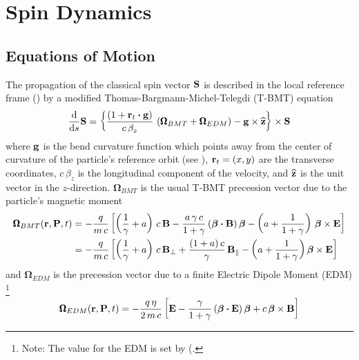 \chapter{Spin Dynamics}
\label{c:spin}

\section{Equations of Motion}
\label{s:spin.dyn}

The propagation of the classical spin vector ${\bf S}$ is described in the local reference
frame () by a modified Thomas-Bargmann-Michel-Telegdi
(T-BMT) equation\cite{b:spin.hoff}
\begin{equation}
  \frac{\mathrm{d}}{\mathrm{d}s} {\bf S} = 
  \left\{ \frac{(1+{\bf r}_t \mathbin{\boldsymbol{\cdot}} {\bf g})}{c \, \beta_z} \, 
  \left( {\pmb\Omega}_{BMT} + {\pmb\Omega}_{EDM} \right) - 
  {\bf g} \times {\widehat{\bf z}} \right\} \times \mathbf{S}
  \label{tbmt}
\end{equation}
where ${\bf g}$ is the bend curvature function which points away from the center of curvature
of the particle's reference orbit (see ), ${\bf r}_t = (x, y)$ are the
transverse coordinates, $c \, \beta_z$ is the longitudinal component of the velocity, and
${\widehat{\bf z}}$ is the unit vector in the $z$-direction. $\pmb\Omega_{BMT}$ is the usual T-BMT
precession vector due to the particle's magnetic moment
\begin{align}
  {\pmb\Omega}_{BMT} (\mathbf{r,P},t) &= 
    - \frac{q}{m \, c} \left[ 
    \left(\frac{1}{\gamma} + a \right) \, c \, {\bf B} -
    \frac{a \, \gamma \, c}{1 + \gamma} \, ( \boldsymbol{\beta} \mathbin{\boldsymbol{\cdot}} {\bf B} ) \, \boldsymbol{\beta} -
    \left( a + \frac{1}{1 + \gamma} \right) \, \mathbf{\boldsymbol{\beta} \times  E} 
    \right] \label{orpt} \\
  &= - \frac{q}{m \, c} \left[ 
    \left( \frac{1}{\gamma} + a \right) \, c \, {\bf B}_{\perp} +
    \frac{(1 + a) \, c}{\gamma} \, {\bf B}_\parallel -
    \left( a + \frac{1}{1 + \gamma} \right) \mathbf{\boldsymbol{\beta} \times E} 
    \right] \nonumber
\end{align}
and $\pmb\Omega_{EDM}$ is the
precession vector due to a finite Electric Dipole Moment (EDM) \cite{b:silenko}\footnote
  {
Note: The value for the EDM is set by  (.
  }
\begin{equation}
  {\pmb\Omega}_{EDM} (\mathbf{r,P},t) = 
  - \frac{q \, \eta}{2 \, m \, c} \left[
  {\bf E} - \frac{\gamma}{1 + \gamma} \, 
  ( \boldsymbol{\beta} \mathbin{\boldsymbol{\cdot}} {\bf E} ) \, \boldsymbol{\beta} +
  c \, \mathbf{\boldsymbol{\beta} \times B}
  \right]
\end{equation}
